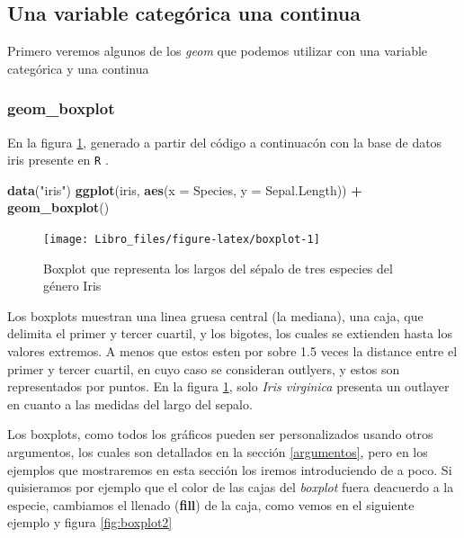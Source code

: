 \documentclass[]{book}
\newenvironment{Shaded}{\begin{snugshade}}{\end{snugshade}}
\newcommand{\DataTypeTok}[1]{\textcolor[rgb]{0.13,0.29,0.53}{#1}}
\newcommand{\KeywordTok}[1]{\textcolor[rgb]{0.13,0.29,0.53}{\textbf{#1}}}
\newcommand{\NormalTok}[1]{#1}
\newcommand{\OperatorTok}[1]{\textcolor[rgb]{0.81,0.36,0.00}{\textbf{#1}}}
\newcommand{\StringTok}[1]{\textcolor[rgb]{0.31,0.60,0.02}{#1}}
\begin{document}
\hypertarget{una-variable-categorica-una-continua}{%
\subsection{Una variable categórica una
continua}\label{una-variable-categorica-una-continua}}

Primero veremos algunos de los \emph{geom} que podemos utilizar con una
variable categórica y una continua

\hypertarget{geom_boxplot}{%
\subsubsection{geom\_boxplot}\label{geom_boxplot}}

En la figura \ref{fig:boxplot}, generado a partir del código a
continuacón con la base de datos iris presente en \texttt{R}
\citep{anderson1935irises}.

\begin{Shaded}
\begin{Highlighting}[]
\KeywordTok{data}\NormalTok{(}\StringTok{"iris"}\NormalTok{)}
\KeywordTok{ggplot}\NormalTok{(iris, }\KeywordTok{aes}\NormalTok{(}\DataTypeTok{x =}\NormalTok{ Species, }\DataTypeTok{y =}\NormalTok{ Sepal.Length)) }\OperatorTok{+}\StringTok{ }\KeywordTok{geom_boxplot}\NormalTok{()}
\end{Highlighting}
\end{Shaded}

\begin{figure}

{\centering \texttt{[image: Libro\_files/figure-latex/boxplot-1]} 

}

\caption{Boxplot que representa los largos del sépalo de tres especies del género Iris}\label{fig:boxplot}
\end{figure}

Los boxplots muestran una linea gruesa central (la mediana), una caja,
que delimita el primer y tercer cuartil, y los bigotes, los cuales se
extienden hasta los valores extremos. A menos que estos esten por sobre
1.5 veces la distance entre el primer y tercer cuartil, en cuyo caso se
consideran outlyers, y estos son representados por puntos. En la figura
\ref{fig:boxplot}, solo \emph{Iris virginica} presenta un outlayer en
cuanto a las medidas del largo del sepalo.

Los boxplots, como todos los gráficos pueden ser personalizados usando
otros argumentos, los cuales son detallados en la sección
\ref{argumentos}, pero en los ejemplos que mostraremos en esta sección
los iremos introduciendo de a poco. Si quisieramos por ejemplo que el
color de las cajas del \emph{boxplot} fuera deacuerdo a la especie,
cambiamos el llenado (\textbf{fill}) de la caja, como vemos en el
siguiente ejemplo y figura \ref{fig:boxplot2}
\end{document}
